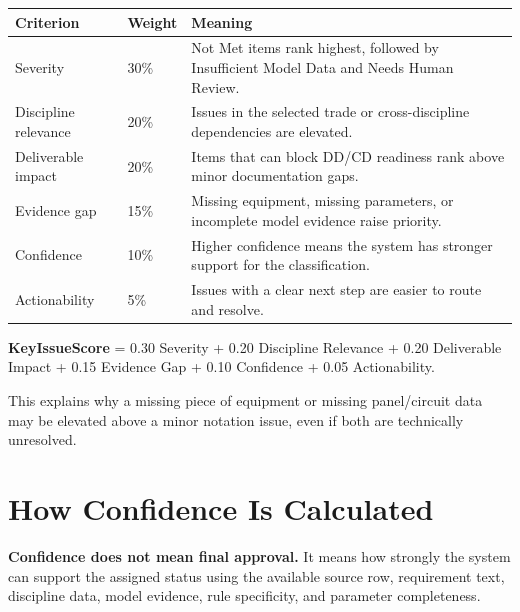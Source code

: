 \documentclass[10pt,letterpaper]{article}
\newcommand{\strong}[1]{\textbf{\textcolor{emaNavy}{#1}}}
\begin{document}
\begin{tcolorbox}
\begin{tabularx}{\textwidth}{p{1.45in}p{0.75in}X}
\toprule
\textbf{Criterion} & \textbf{Weight} & \textbf{Meaning} \\
\midrule
Severity & 30\% & Not Met items rank highest, followed by Insufficient Model Data and Needs Human Review. \\
Discipline relevance & 20\% & Issues in the selected trade or cross-discipline dependencies are elevated. \\
Deliverable impact & 20\% & Items that can block DD/CD readiness rank above minor documentation gaps. \\
Evidence gap & 15\% & Missing equipment, missing parameters, or incomplete model evidence raise priority. \\
Confidence & 10\% & Higher confidence means the system has stronger support for the classification. \\
Actionability & 5\% & Issues with a clear next step are easier to route and resolve. \\
\bottomrule
\end{tabularx}
\end{tcolorbox}

\begin{tcolorbox}[colback=white,borderline west={3pt}{0pt}{emaBlue}]
\strong{KeyIssueScore} = 0.30 Severity + 0.20 Discipline Relevance + 0.20 Deliverable Impact + 0.15 Evidence Gap + 0.10 Confidence + 0.05 Actionability.

\vspace{3pt}
This explains why a missing piece of equipment or missing panel/circuit data may be elevated above a minor notation issue, even if both are technically unresolved.
\end{tcolorbox}

\section*{How Confidence Is Calculated}

\begin{tcolorbox}[colback=white]
\strong{Confidence does not mean final approval.} It means how strongly the system can support the assigned status using the available source row, requirement text, discipline data, model evidence, rule specificity, and parameter completeness.
\end{tcolorbox}
\end{document}
